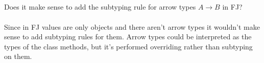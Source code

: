 \subsection{}

Does it make sense to add the subtyping rule for arrow types $A \to B$ in FJ?\\~\\
Since in FJ values are only objects and there aren't arrow types it wouldn't make sense to add
subtyping rules for them. Arrow types could be interpreted as the types of the class methods,
but it's performed overriding rather than subtyping on them.
